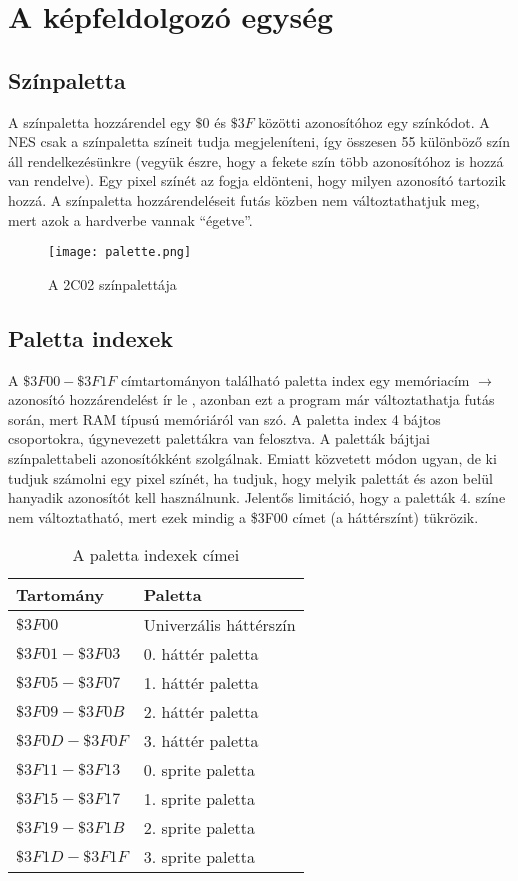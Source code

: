 \section{A képfeldolgozó egység}

\subsection{Színpaletta}

A színpaletta \cite{ppuref} hozzárendel egy $\$0$ és $\$3F$ közötti azonosítóhoz egy színkódot. A NES csak a színpaletta színeit tudja megjeleníteni, így összesen 55 különböző szín áll rendelkezésünkre (vegyük észre, hogy a fekete szín több azonosítóhoz is hozzá van rendelve). Egy pixel színét az fogja eldönteni, hogy milyen azonosító tartozik hozzá. A színpaletta hozzárendeléseit futás közben nem változtathatjuk meg, mert azok a hardverbe vannak ``égetve''.

\vspace{0.3cm}
\begin{figure}[H]
	\centering
	\texttt{[image: palette.png]}
	\caption{A 2C02 színpalettája}
\end{figure}

\subsection{Paletta indexek}

A $\$3F00 - \$3F1F$ címtartományon található paletta index egy memóriacím $\rightarrow$ azonosító hozzárendelést ír le \cite{ppuref}, azonban ezt a program már változtathatja futás során, mert RAM típusú memóriáról van szó. A paletta index 4 bájtos csoportokra, úgynevezett palettákra van felosztva. A paletták bájtjai színpalettabeli azonosítókként szolgálnak. Emiatt közvetett módon ugyan, de ki tudjuk számolni egy pixel színét, ha tudjuk, hogy melyik palettát és azon belül hanyadik azonosítót kell használnunk. Jelentős limitáció, hogy a paletták 4. színe nem változtatható, mert ezek mindig a \$3F00 címet (a háttérszínt) tükrözik.

\begin{table}[H]
	\centering
	\begin{tabular}{ | l | l | }
		\hline
		Tartomány & Paletta \\
		\hline			
		$ \$3F00 $ & Univerzális háttérszín \\
		$ \$3F01 - \$3F03 $ & 0. háttér paletta \\
		$ \$3F05 - \$3F07 $ & 1. háttér paletta \\
		$ \$3F09 - \$3F0B $ & 2. háttér paletta \\
		$ \$3F0D - \$3F0F $ & 3. háttér paletta \\
		$ \$3F11 - \$3F13 $ & 0. sprite paletta \\
		$ \$3F15 - \$3F17 $ & 1. sprite paletta \\
		$ \$3F19 - \$3F1B $ & 2. sprite paletta \\
		$ \$3F1D - \$3F1F $ & 3. sprite paletta \\
		\hline
	\end{tabular}
	\caption{A paletta indexek címei}
	\label{fig:paletteram}
\end{table}

